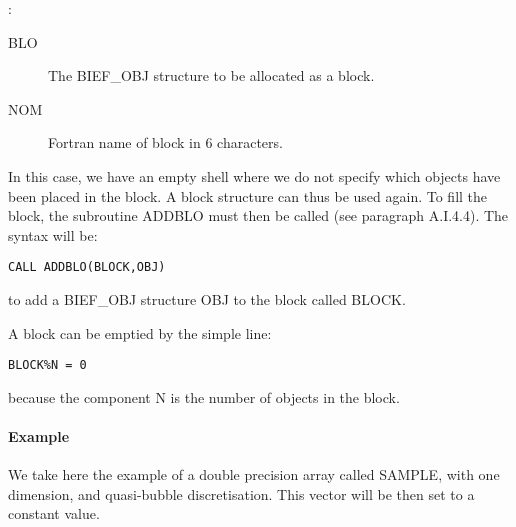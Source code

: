 :
\begin{description}
  \item [BLO] The BIEF\_OBJ structure to be allocated as a block.
  \item [NOM] Fortran name of block in 6 characters.
\end{description}
In this case, we have an empty shell where we do not specify which objects have
been placed in the block. A block structure can thus be used again. To fill the
block, the subroutine ADDBLO must then be called (see paragraph A.I.4.4). The
syntax will be:

\begin{lstlisting}[language=TelFortran]
CALL ADDBLO(BLOCK,OBJ)
\end{lstlisting}
to add a BIEF\_OBJ structure OBJ to the block called BLOCK.

A block can be emptied by the simple line:

\begin{lstlisting}[language=TelFortran]
BLOCK%N = 0
\end{lstlisting}

because the component N is the number of objects in the block.

\paragraph{Example}

We take here the example of a double precision array called SAMPLE, with one
dimension, and quasi-bubble discretisation. This vector will be then set to a
constant value.

